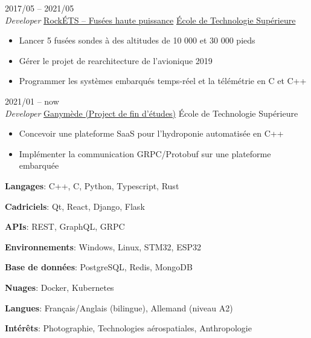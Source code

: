 \documentclass[9pt]{developercv2} %
\begin{document}
\begin{entrylist}
	\entry
	{2017/05 -- 2021/05\\{\small\emph{Developer}}}
	{\href{https://clubrockets.ca/}{RockÉTS -- Fusées haute puissance}}
		{\href{https://clubrockets.ca/}{École de Technologie Supérieure}}
	{
		\vspace{-14pt}
		\begin{itemize}
			\renewcommand{\labelitemi}{\raisebox{.45ex}{\rule{.6ex}{.6ex}}}
			\setlength\itemsep{-1pt}
			\item Lancer 5 fusées sondes à des altitudes de 10 000 et 30 000 pieds
			\item Gérer le projet de rearchitecture de l'avionique 2019
			\item Programmer les systèmes embarqués temps-réel et la télémétrie en C et C++
		\end{itemize}
	}
	\entry
	{2021/01 -- now\\{\small\emph{Developer}}}
	{\href{https://github.com/ngc7293/ganymede}{Ganymède (Project de fin d'études)}}
	{École de Technologie Supérieure}
	{
	\vspace{-14pt}
	\begin{itemize}
		\renewcommand{\labelitemi}{\raisebox{.45ex}{\rule{.6ex}{.6ex}}}
		\setlength\itemsep{-1pt}
		\item Concevoir une plateforme SaaS pour l'hydroponie automatisée en C++
		\item Implémenter la communication GRPC/Protobuf sur une plateforme embarquée
	\end{itemize}
	\vspace{-12pt}
	}
\end{entrylist}
\vspace{-\baselineskip}

\begin{minipage}[t]{0.5\textwidth}
	\textbf{Langages}: C++, C, Python, Typescript, Rust

	\textbf{Cadriciels}: Qt, React, Django, Flask

	\textbf{APIs}: REST, GraphQL, GRPC
\end{minipage}
\begin{minipage}[t]{0.5\textwidth}
	\textbf{Environnements}: Windows, Linux, STM32, ESP32

	\textbf{Base de données}: PostgreSQL, Redis, MongoDB

	\textbf{Nuages}: Docker, Kubernetes
\end{minipage}

\textbf{Langues}: Français/Anglais (bilingue), Allemand (niveau A2)

\textbf{Intérêts}: Photographie, Technologies aérospatiales, Anthropologie
\end{document}
